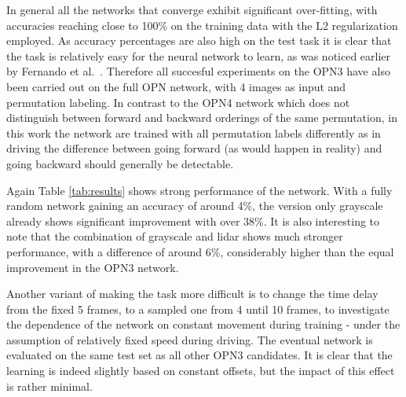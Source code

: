 In general all the networks that converge exhibit significant over-fitting, with accuracies reaching close to 100\% on the training data with the L2 regularization employed. As accuracy percentages are also high on the test task it is clear that the task is relatively easy for the neural network to learn, as was noticed earlier by Fernando et al.~\cite{fernando2017}. Therefore all succesful experiments on the OPN3 have also been carried out on the full OPN network\cite{lee2017}, with 4 images as input and permutation labeling. In contrast to the OPN4 network which does not distinguish between forward and backward orderings of the same permutation, in this work the network are trained with all permutation labels differently as in driving the difference between going forward (as would happen in reality) and going backward should generally be detectable. 

Again Table \ref{tab:results} shows strong performance of the network. With a fully random network gaining an accuracy of around 4\%, the version only grayscale already shows significant improvement with over 38\%. It is also interesting to note that the combination of grayscale and lidar shows much stronger performance, with a difference of around 6\%, considerably higher than the equal improvement in the OPN3 network.

Another variant of making the task more difficult is to change the time delay from the fixed 5 frames, to a sampled one from 4 until 10 frames, to investigate the dependence of the network on constant movement during training - under the assumption of relatively fixed speed during driving. The eventual network is evaluated on the same test set as all other OPN3 candidates. It is clear that the learning is indeed slightly based on constant offsets, but the impact of this effect is rather minimal.


